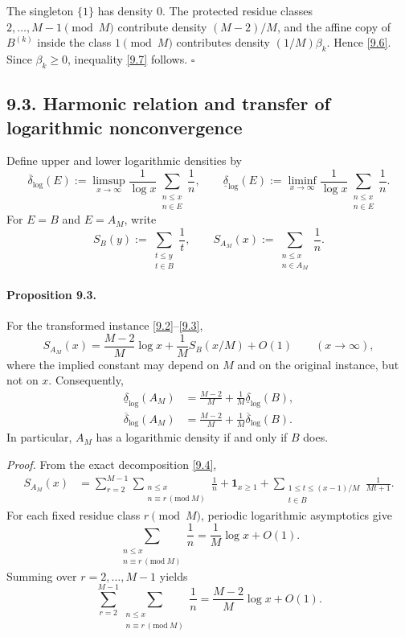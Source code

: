 The singleton $\{1\}$ has density $0$.  The protected residue classes $2,\dots,M-1\pmod M$ contribute density $(M-2)/M$, and the affine copy of $B^{(k)}$ inside the class $1\pmod M$ contributes density $(1/M)\beta_k$.  Hence \eqref{9.6}.  Since $\beta_k\ge 0$, inequality \eqref{9.7} follows. \hfill $\square$

\subsection*{9.3. Harmonic relation and transfer of logarithmic nonconvergence}
Define upper and lower logarithmic densities by
\[
\overline{\delta}_{\log}(E):=
\limsup_{x\to\infty}\frac{1}{\log x}\sum_{\substack{n\le x\\ n\in E}}\frac1n,
\qquad
\underline{\delta}_{\log}(E):=
\liminf_{x\to\infty}\frac{1}{\log x}\sum_{\substack{n\le x\\ n\in E}}\frac1n.
\]
For $E=B$ and $E=A_M$, write
\[
S_B(y):=\sum_{\substack{t\le y\\ t\in B}}\frac1t,
\qquad
S_{A_M}(x):=\sum_{\substack{n\le x\\ n\in A_M}}\frac1n.
\]

\paragraph{Proposition 9.3.}
For the transformed instance \eqref{9.2}--\eqref{9.3},
\begin{equation}
S_{A_M}(x)=\frac{M-2}{M}\log x+\frac1M S_B(x/M)+O(1)
\qquad (x\to\infty),
\tag{9.8}
\end{equation}
where the implied constant may depend on $M$ and on the original instance, but not on $x$.
Consequently,
\begin{align}
\underline{\delta}_{\log}(A_M)
&=
\frac{M-2}{M}+\frac1M\underline{\delta}_{\log}(B),
\tag{9.9}\\
\overline{\delta}_{\log}(A_M)
&=
\frac{M-2}{M}+\frac1M\overline{\delta}_{\log}(B).
\tag{9.10}
\end{align}
In particular, $A_M$ has a logarithmic density if and only if $B$ does.

\emph{Proof.}
From the exact decomposition \eqref{9.4},
\begin{align}
S_{A_M}(x)
&=
\sum_{r=2}^{M-1}\sum_{\substack{n\le x\\ n\equiv r\, (\mathrm{mod}\ M)}}\frac1n
+\mathbf 1_{x\ge 1}
+\sum_{\substack{1\le t\le (x-1)/M\\ t\in B}}\frac1{Mt+1}.
\tag{9.11}
\end{align}
For each fixed residue class $r\pmod M$, periodic logarithmic asymptotics give
\[
\sum_{\substack{n\le x\\ n\equiv r\, (\mathrm{mod}\ M)}}\frac1n
=
\frac1M\log x+O(1).
\]
Summing over $r=2,\dots,M-1$ yields
\begin{equation}
\sum_{r=2}^{M-1}\sum_{\substack{n\le x\\ n\equiv r\, (\mathrm{mod}\ M)}}\frac1n
=
\frac{M-2}{M}\log x+O(1).
\tag{9.12}
\end{equation}

